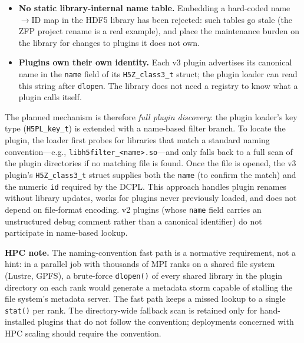 \documentclass[../RFC-HDFG-2026-001.tex]{subfiles}
\begin{document}
\begin{itemize}
\item \textbf{No static library-internal name table.}  Embedding a
  hard-coded name$\rightarrow$ID map in the HDF5 library has been
  rejected: such tables go stale (the ZFP project rename is a real
  example), and place the maintenance burden on the library for changes
  to plugins it does not own.

\item \textbf{Plugins own their own identity.}  Each v3 plugin
  advertises its canonical name in the \texttt{name} field of its
  \texttt{H5Z\_class3\_t} struct; the plugin loader can read this
  string after \texttt{dlopen}.  The library does not need a registry
  to know what a plugin calls itself.
\end{itemize}

The planned mechanism is therefore \emph{full plugin discovery}: the
plugin loader's key type (\texttt{H5PL\_key\_t}) is extended with a
name-based filter branch.  To locate the plugin, the loader first
probes for libraries that match a standard naming convention---e.g.,
\texttt{libh5filter\_<name>.so}---and only falls back to a full scan
of the plugin directories if no matching file is found.  Once the file
is opened, the v3 plugin's \texttt{H5Z\_class3\_t} struct supplies
both the \texttt{name} (to confirm the match) and the numeric
\texttt{id} required by the DCPL.  This approach handles plugin
renames without library updates, works for plugins never previously
loaded, and does not depend on file-format encoding.  v2 plugins
(whose \texttt{name} field carries an unstructured debug comment
rather than a canonical identifier) do not participate in name-based
lookup.

\textbf{HPC note.}  The naming-convention fast path is a normative
requirement, not a hint: in a parallel job with thousands of MPI ranks
on a shared file system (Lustre, GPFS), a brute-force
\texttt{dlopen()} of every shared library in the plugin directory on
each rank would generate a metadata storm capable of stalling the
file system's metadata server.  The fast path keeps a missed lookup
to a single \texttt{stat()} per rank.  The directory-wide fallback
scan is retained only for hand-installed plugins that do not follow
the convention; deployments concerned with HPC scaling should
require the convention.
\end{document}

